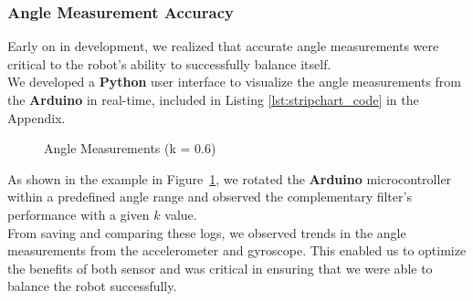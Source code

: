 \documentclass{article}
\begin{document}
\subsubsection{Angle Measurement Accuracy}

\begin{minipage}{\linewidth}
    Early on in development, we realized that accurate angle measurements were critical to the robot's ability to successfully
    balance itself. \\

    We developed a \textbf{Python} user interface to visualize the angle measurements from the \textbf{Arduino} in real-time,
    included in Listing \ref{lst:stripchart_code} in the Appendix. \\
\end{minipage}

\begin{figure}[H]
    \centering
    \caption{Angle Measurements (k = 0.6)}
    \label{fig:stripchart_k06}
\end{figure}

\begin{minipage}{\linewidth}
    As shown in the example in Figure~\ref{fig:stripchart_k06}, we rotated the \textbf{Arduino} microcontroller within a predefined angle range
    and observed the complementary filter's performance with a given $k$ value. \\

    From saving and comparing these logs, we observed trends in the
    angle measurements from the accelerometer and gyroscope. This enabled us to optimize the benefits of both sensor and
    was critical in ensuring that we were able to balance the robot successfully.
\end{minipage}
\end{document}
